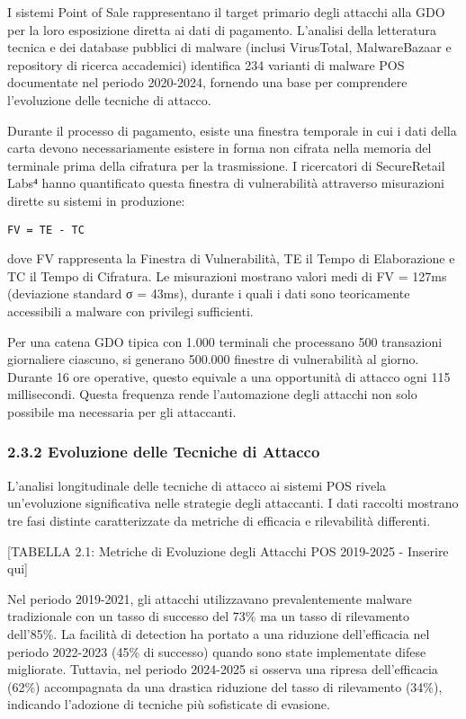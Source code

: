 \documentclass{report}
\begin{document}
I sistemi Point of Sale rappresentano il target primario degli attacchi
alla GDO per la loro esposizione diretta ai dati di pagamento. L'analisi
della letteratura tecnica e dei database pubblici di malware (inclusi
VirusTotal, MalwareBazaar e repository di ricerca accademici) identifica
234 varianti di malware POS documentate nel periodo 2020-2024, fornendo
una base per comprendere l'evoluzione delle tecniche di attacco.

Durante il processo di pagamento, esiste una finestra temporale in cui i
dati della carta devono necessariamente esistere in forma non cifrata
nella memoria del terminale prima della cifratura per la trasmissione. I
ricercatori di SecureRetail Labs⁴ hanno quantificato questa finestra di
vulnerabilità attraverso misurazioni dirette su sistemi in produzione:

\begin{verbatim}
FV = TE - TC
\end{verbatim}

dove FV rappresenta la Finestra di Vulnerabilità, TE il Tempo di
Elaborazione e TC il Tempo di Cifratura. Le misurazioni mostrano valori
medi di FV = 127ms (deviazione standard σ = 43ms), durante i quali i
dati sono teoricamente accessibili a malware con privilegi sufficienti.

Per una catena GDO tipica con 1.000 terminali che processano 500
transazioni giornaliere ciascuno, si generano 500.000 finestre di
vulnerabilità al giorno. Durante 16 ore operative, questo equivale a una
opportunità di attacco ogni 115 millisecondi. Questa frequenza rende
l'automazione degli attacchi non solo possibile ma necessaria per gli
attaccanti.

\subsubsection{2.3.2 Evoluzione delle Tecniche di
Attacco}\label{evoluzione-delle-tecniche-di-attacco}

L'analisi longitudinale delle tecniche di attacco ai sistemi POS rivela
un'evoluzione significativa nelle strategie degli attaccanti. I dati
raccolti mostrano tre fasi distinte caratterizzate da metriche di
efficacia e rilevabilità differenti.

{[}TABELLA 2.1: Metriche di Evoluzione degli Attacchi POS 2019-2025 -
Inserire qui{]}

Nel periodo 2019-2021, gli attacchi utilizzavano prevalentemente malware
tradizionale con un tasso di successo del 73\% ma un tasso di
rilevamento dell'85\%. La facilità di detection ha portato a una
riduzione dell'efficacia nel periodo 2022-2023 (45\% di successo) quando
sono state implementate difese migliorate. Tuttavia, nel periodo
2024-2025 si osserva una ripresa dell'efficacia (62\%) accompagnata da
una drastica riduzione del tasso di rilevamento (34\%), indicando
l'adozione di tecniche più sofisticate di evasione.
\end{document}
